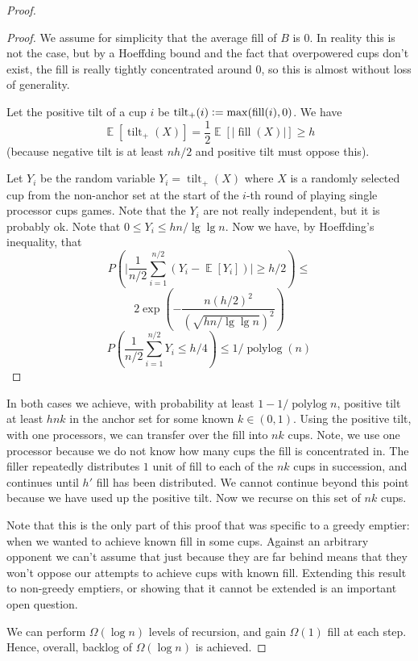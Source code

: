 \documentclass[twocolumn]{article}[11pt]
\DeclareMathOperator{\E}{\mathbb{E}}
\DeclareMathOperator{\polylog}{\text{polylog}}
\DeclareMathOperator{\tilt}{\text{tilt}}
\DeclareMathOperator{\fil}{\text{fill}}
\newcommand{\defeq}{\vcentcolon=}
\begin{document}
\begin{proof}
\begin{proof}

  We assume for simplicity that the average fill of $B$ is $0$. In reality this
  is not the case, but by a Hoeffding bound and the fact that overpowered cups don't
  exist, the fill is really tightly concentrated around $0$, so this is almost
  without loss of generality.

  Let the positive tilt of a cup $i$ be $\tilt_+(i) \defeq \max(\fil(i), 0)$.
  We have
  $$\E[\tilt_+(X)] = \frac{1}{2}\E[|\fil(X)|] \ge h$$
  (because negative tilt is at least $nh/2$ and positive tilt must oppose this).
  
  Let $Y_i$ be the random variable $Y_i=\tilt_+(X)$ where $X$ is a randomly
  selected cup from the non-anchor set at the start of the $i$-th round of
  playing single processor cups games. {\color{red}Note that the $Y_i$ are not really
  independent, but it is probably ok}. Note that $0\le Y_i \le hn/\lg\lg n$.
  Now we have, by Hoeffding's inequality, that 
  $$P\left(\Big|\frac{1}{n/2} \sum_{i=1}^{n/2} (Y_i - \E[Y_i])\Big|\ge h/2
  \right) \le$$
  $$2\exp\left(-\frac{n(h/2)^2}{(\sqrt{hn/\lg\lg n})^2}\right) $$
  $$P\left(\frac{1}{n/2}\sum_{i=1}^{n/2} Y_i \le h/4\right) \le 1/\polylog(n) $$

\end{proof}

  In both cases we achieve, with probability at least $1-1/\polylog n$,
  positive tilt at least $hnk$ in the anchor set for some known $k\in(0,1)$. Using the
  positive tilt, with one processors, we can transfer over the fill into $nk$ cups. 
  Note, we use one processor because we do not know how many cups the fill is
  concentrated in. The filler repeatedly distributes $1$ unit of fill to each
  of the $nk$ cups in succession, and continues until $h'$ fill has been
  distributed. We cannot continue beyond this point because we have used up the
  positive tilt. Now we recurse on this set of $nk$ cups.

  Note that this is the only part of this proof that was specific to a greedy
  emptier: when we wanted to achieve known fill in some cups. Against an
  arbitrary opponent we can't assume that just because they are far behind
  means that they won't oppose our attempts to achieve cups with known fill.
  Extending this result to non-greedy emptiers, or showing that it cannot be
  extended is an important open question.

  We can perform $\Omega(\log n)$ levels of recursion, and gain $\Omega(1)$
  fill at each step. Hence, overall, backlog of $\Omega(\log n)$ is achieved.
\end{proof}
\end{document}
